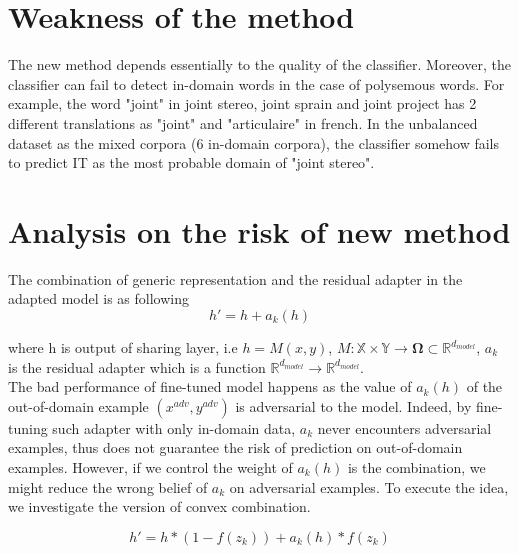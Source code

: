 \documentclass[12pt,a4paper,twoside]{report}
\theoremstyle{definition}
\begin{document}
\section*{Weakness of the method}
The new method depends essentially to the quality of the classifier. Moreover, the classifier can fail to detect in-domain words in the case of polysemous words. For example, the word "joint" in joint stereo, joint sprain and joint project has 2 different translations as "joint" and "articulaire" in french. In the unbalanced dataset as the mixed corpora (6 in-domain corpora), the classifier somehow fails to predict IT as the most probable domain of "joint stereo".

\section*{Analysis on the risk of new method}

The combination of generic representation and the residual adapter in the adapted model is as following
\begin{equation}
h' = h + a_k(h)
\label{eq:1}
\end{equation}

where h is output of sharing layer, i.e $h=M(x,y)$, $M: \mathbb{X} \times \mathbb{Y} \rightarrow \mathbf{\Omega}\subset \mathbb{R}^{d_{model}}$, $a_k$ is the residual adapter which is a function $\mathbb{R}^{d_{model}} \rightarrow \mathbb{R}^{d_{model}}$. \\

The bad performance of fine-tuned model happens as the value of $a_k(h)$ of the out-of-domain example $(x^{adv}, y^{adv})$ is adversarial to the model. Indeed, by fine-tuning such adapter with only in-domain data, $a_k$ never encounters adversarial examples, thus does not guarantee the risk of prediction on out-of-domain examples. However, if we control the weight of $a_k(h)$ is the combination, we might reduce the wrong belief of $a_k$ on adversarial examples. To execute the idea, we  investigate the version of convex combination.

\begin{equation}
h' = h * (1-f(z_k)) + a_k(h) * f(z_k)
\label{eq:2}
\end{equation}
\end{document}
